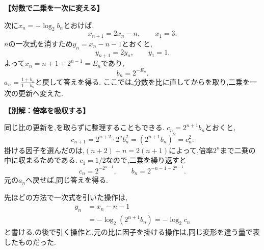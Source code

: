 \begin{enumerate}[label=\textbf{問\arabic*.},leftmargin=3.8em,format=\bookitemlink{practice-advanced}{solution}{problem}]
                \par\smallskip\noindent\textbf{【対数で二乗を一次に変える】}\par\nopagebreak[4]
                次に$x_n=-\log_2b_n$とおけば,
                \[
                  x_{n+1}=2x_n-n,\qquad x_1=3.
                \]
                $n$の一次式を消すため$y_n=x_n-n-1$とおくと,
                \[
                  y_{n+1}=2y_n,\qquad y_1=1.
                \]
                よって$x_n=n+1+2^{n-1}=E_n$であり,
                \[
                  b_n=2^{-E_n}.
                \]
                $\displaystyle a_n=\frac{1+b_n}{1-b_n}$と戻して答えを得る.
                ここでは,分数を比に直してからを取り,二乗を一次の更新へ変えた.

                \par\smallskip\noindent\textbf{【別解：倍率を吸収する】}\par\nopagebreak[4]
                同じ比の更新を,を取らずに整理することもできる.
                $c_n=2^{n+1}b_n$とおくと,
                \[
                  c_{n+1}=2^{n+2}\cdot2^n b_n^2
                           =(2^{n+1}b_n)^2=c_n^2.
                \]
                掛ける因子を選んだのは,$(n+2)+n=2(n+1)$によって,倍率$2^n$まで二乗の中に収まるためである.
                $c_1=1/2$なので,二乗を繰り返すと
                \[
                  c_n=2^{-2^{n-1}},\qquad
                  b_n=2^{-n-1-2^{n-1}}.
                \]
                元の$a_n$へ戻せば,同じ答えを得る.
                \par\smallskip
                先ほどの方法で一次式を引いた操作は,
                \begin{align*}
                  y_n&=x_n-n-1\\
                     &=-\log_2(2^{n+1}b_n)=-\log_2c_n
                \end{align*}
                と書ける.の後で引く操作と,元の比に因子を掛ける操作は,同じ変形を違う量で表したものだった.
        \end{enumerate}
